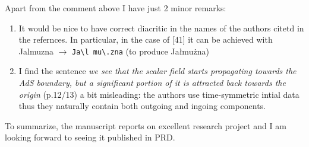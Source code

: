 \documentclass[12pt, twoside]{article}
\begin{document}
\noindent
Apart from the comment above I have just 2 minor remarks:
\begin{enumerate}
\item It would be nice to have correct diacritic in the names of the authors
citetd in the refernces. In particular, in the case of [41] it can be achieved
with Jalmuzna $\rightarrow$ \verb+Ja\l mu\.zna+ (to produce Ja\l mu\.zna)
\item I find the sentence \textit{we see that the scalar field starts
propagating towards the AdS boundary, but a significant portion of it is
attracted back towards the origin} (p.12/13) a bit misleading: the authors use
time-symmetric intial data thus they naturally contain both outgoing and ingoing
components. 

\end{enumerate} 

To summarize, the manuscript reports on excellent research project and I am
looking forward to seeing it published in PRD.
\end{document}
